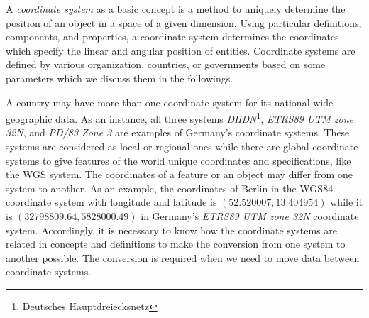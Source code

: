 \documentclass[a4paper,12pt]{article}
\begin{document}
A \emph{coordinate system} as a basic concept is a method to uniquely determine the position of an object in a space of a given dimension. Using particular definitions, components, and properties, a coordinate system determines the coordinates which specify the linear and angular position of entities. Coordinate systems are defined by various organization, countries, or governments based on some parameters which we discuss them in the followings.

A country may have more than one coordinate system for its national-wide geographic data. As an instance, all three systems \textit{DHDN}\footnote{Deutsches Hauptdreiecksnetz}, \textit{ETRS89 UTM zone 32N}, and \textit{PD/83 Zone 3} are examples of Germany's coordinate systems. These systems are considered as local or regional ones while there are global coordinate systems to give features of the world unique coordinates and specifications, like the WGS system. The coordinates of a feature or an object may differ from one system to another. As an example, the coordinates of Berlin in the WGS84 coordinate system with longitude and latitude is $(52.520007, 13.404954)$ while it is $(32798809.64, 5828000.49)$ in Germany's \textit{ETRS89 UTM zone 32N} coordinate system. Accordingly, it is necessary to know how the coordinate systems are related in concepts and definitions to make the conversion from one system to another possible. The conversion is required when we need to move data between coordinate systems.
\end{document}
